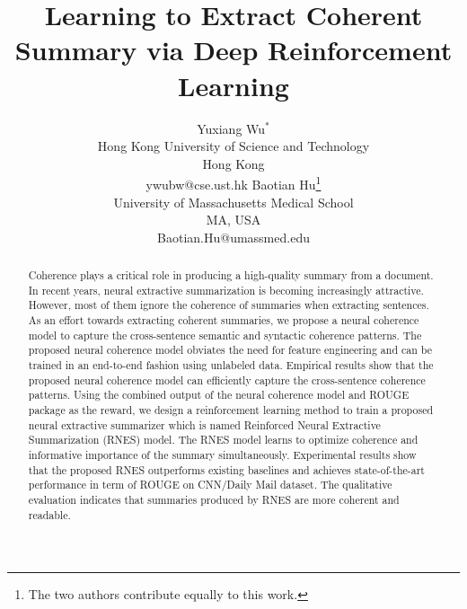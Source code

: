 \documentclass[letterpaper]{article} \usepackage{aaai18}  \usepackage{times}  \usepackage{helvet}  \usepackage{courier}  \usepackage{url}  \usepackage{graphicx}  \usepackage{amssymb}
\begin{document}
\title{Learning to Extract Coherent Summary via Deep Reinforcement Learning}
	\author{Yuxiang Wu$^{*}$ \\ Hong Kong University of Science and Technology\\Hong Kong\\ywubw@cse.ust.hk
	\And Baotian Hu\thanks{The two authors contribute equally to this work.}\\University of Massachusetts Medical School\\MA, USA\\Baotian.Hu@umassmed.edu}

	\maketitle
	\begin{abstract}
		 Coherence plays a critical role in producing a high-quality summary from a document. In recent years, neural extractive summarization is becoming increasingly attractive. However, most of them ignore the coherence of summaries when extracting sentences. As an effort towards extracting coherent summaries, we propose a neural coherence model to capture the cross-sentence semantic and syntactic coherence patterns. The proposed neural coherence model obviates the need for feature engineering and can be trained in an end-to-end fashion using unlabeled data. Empirical results show that the proposed neural coherence model can efficiently capture the cross-sentence coherence patterns. Using the combined output of the neural coherence model and ROUGE package as the reward, we design a reinforcement learning method to train a proposed neural extractive summarizer which is named Reinforced Neural Extractive Summarization (RNES) model. The RNES model learns to optimize coherence and informative importance of the summary simultaneously. Experimental results show that the proposed RNES outperforms existing baselines and achieves state-of-the-art performance in term of ROUGE on CNN/Daily Mail dataset. The qualitative evaluation indicates that summaries produced by RNES are more coherent and readable.
	\end{abstract}
	
	
\end{document}
